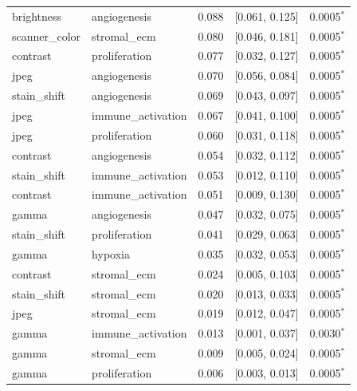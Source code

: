 \begin{table}[t]
\begin{tabular}{llccc}
brightness & angiogenesis & 0.088 & [0.061, 0.125] & 0.0005$^{*}$ \\
scanner\_color & stromal\_ecm & 0.080 & [0.046, 0.181] & 0.0005$^{*}$ \\
contrast & proliferation & 0.077 & [0.032, 0.127] & 0.0005$^{*}$ \\
jpeg & angiogenesis & 0.070 & [0.056, 0.084] & 0.0005$^{*}$ \\
stain\_shift & angiogenesis & 0.069 & [0.043, 0.097] & 0.0005$^{*}$ \\
jpeg & immune\_activation & 0.067 & [0.041, 0.100] & 0.0005$^{*}$ \\
jpeg & proliferation & 0.060 & [0.031, 0.118] & 0.0005$^{*}$ \\
contrast & angiogenesis & 0.054 & [0.032, 0.112] & 0.0005$^{*}$ \\
stain\_shift & immune\_activation & 0.053 & [0.012, 0.110] & 0.0005$^{*}$ \\
contrast & immune\_activation & 0.051 & [0.009, 0.130] & 0.0005$^{*}$ \\
gamma & angiogenesis & 0.047 & [0.032, 0.075] & 0.0005$^{*}$ \\
stain\_shift & proliferation & 0.041 & [0.029, 0.063] & 0.0005$^{*}$ \\
gamma & hypoxia & 0.035 & [0.032, 0.053] & 0.0005$^{*}$ \\
contrast & stromal\_ecm & 0.024 & [0.005, 0.103] & 0.0005$^{*}$ \\
stain\_shift & stromal\_ecm & 0.020 & [0.013, 0.033] & 0.0005$^{*}$ \\
jpeg & stromal\_ecm & 0.019 & [0.012, 0.047] & 0.0005$^{*}$ \\
gamma & immune\_activation & 0.013 & [0.001, 0.037] & 0.0030$^{*}$ \\
gamma & stromal\_ecm & 0.009 & [0.005, 0.024] & 0.0005$^{*}$ \\
gamma & proliferation & 0.006 & [0.003, 0.013] & 0.0005$^{*}$ \\
\bottomrule
\end{tabular}
\end{table}
